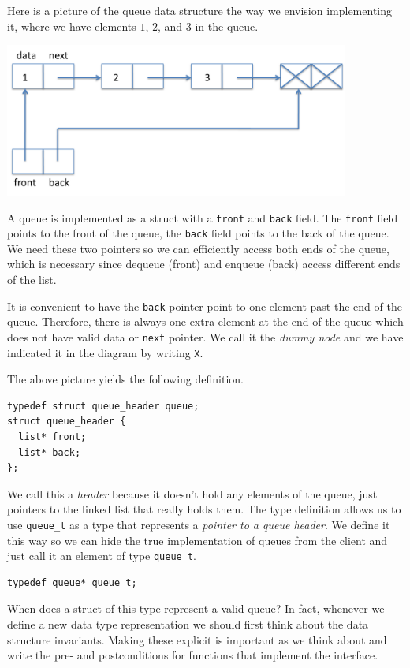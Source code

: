 Here is a picture of the queue data structure the way we envision
implementing it, where we have elements $1$, $2$, and $3$ in the queue.
\begin{center}
\includegraphics[width=0.85\textwidth]{img/queue1.png}
\end{center}

A queue is implemented as a struct with a \lstinline'front' and \lstinline'back'
field.  The \lstinline'front' field points to the front of the queue, the
\lstinline'back' field points to the back of the queue.  We need these two
pointers so we can efficiently access both ends of the queue, which is
necessary since dequeue (front) and enqueue (back) access different
ends of the list.

It is convenient to have the \lstinline'back' pointer point to one
element past the end of the queue.  Therefore, there is always one
extra element at the end of the queue which does not have valid data
or \lstinline'next' pointer.  We call it the \emph{dummy node} and we
have indicated it in the diagram by writing \lstinline'X'.

The above picture yields the following definition.
\begin{lstlisting}[language={[C0]C}]
typedef struct queue_header queue;
struct queue_header {
  list* front;
  list* back;
};
\end{lstlisting}
We call this a \emph{header} because it doesn't hold any elements of
the queue, just pointers to the linked list that really holds them.
The type definition allows us to use \lstinline'queue_t' as a type that
represents a \emph{pointer to a queue header}.  We define it this way
so we can hide the true implementation of queues from the client and
just call it an element of type \lstinline'queue_t'.
\begin{lstlisting}[language={[C0]C}]
typedef queue* queue_t;
\end{lstlisting}


When does a struct of this type represent a valid queue?  In fact,
whenever we define a new data type representation we should first
think about the data structure invariants.  Making these explicit is
important as we think about and write the pre- and postconditions for
functions that implement the interface.

